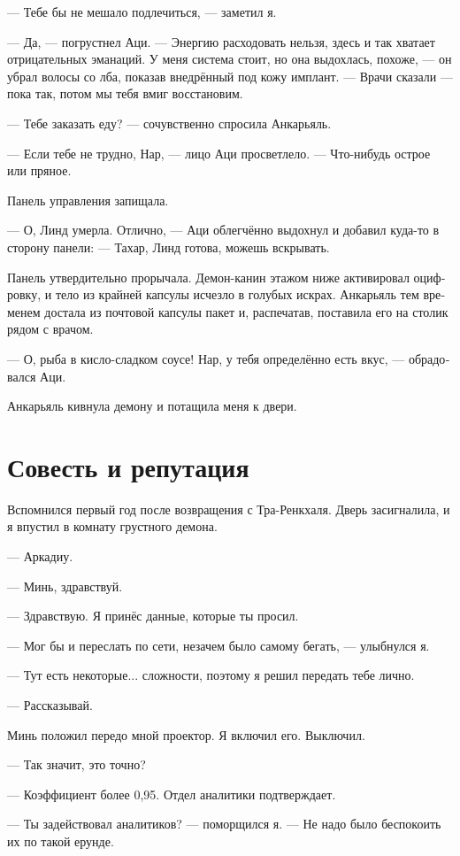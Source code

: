 \documentclass[a4paper,12pt,fleqn]{book}\usepackage{cooltooltips}\usepackage{polyglossia}\setdefaultlanguage[babelshorthands=true]{russian}\setotherlanguage{english}\defaultfontfeatures{Ligatures=TeX,Mapping=tex-text} \usepackage{xcolor}\definecolor{lightgray}{HTML}{bbbbbb}\color{lightgray}\newcommand{\ml}[3]{\textenglish{\textcolor{black}{#3}}}
\begin{document}
{--- Тебе бы не мешало подлечиться, --- заметил я.

--- Да, --- погрустнел Аци.
--- Энергию расходовать нельзя, здесь и так хватает отрицательных эманаций.
У меня система стоит, но она выдохлась, похоже, --- он убрал волосы со лба, показав внедрённый под кожу имплант.
--- Врачи сказали --- пока так, потом мы тебя вмиг восстановим.

--- Тебе заказать еду? --- сочувственно спросила Анкарьяль.

--- Если тебе не трудно, Нар, --- лицо Аци просветлело.
--- Что-нибудь острое или пряное.

Панель управления запищала.

--- О, Линд умерла.
Отлично, --- Аци облегчённо выдохнул и добавил куда-то в сторону панели:
--- Тахар, Линд готова, можешь вскрывать.

Панель утвердительно прорычала.
Демон-канин этажом ниже активировал оцифровку, и тело из крайней капсулы исчезло в голубых искрах.
Анкарьяль тем временем достала из почтовой капсулы пакет и, распечатав, поставила его на столик рядом с врачом.

--- О, рыба в кисло-сладком соусе!
Нар, у тебя определённо есть вкус, --- обрадовался Аци.

Анкарьяль кивнула демону и потащила меня к двери.

\section{Совесть и репутация}

Вспомнился первый год после возвращения с Тра-Ренкхаля.
Дверь засигналила, и я впустил в комнату грустного демона.

--- Аркадиу.

--- Минь, здравствуй.

--- Здравствую.
Я принёс данные, которые ты просил.

--- Мог бы и переслать по сети, незачем было самому бегать, --- улыбнулся я.

--- Тут есть некоторые... сложности, поэтому я решил передать тебе лично.

--- Рассказывай.

Минь положил передо мной проектор.
Я включил его.
Выключил.

--- Так значит, это точно?

--- Коэффициент более 0,95.
Отдел аналитики подтверждает.

--- Ты задействовал аналитиков? --- поморщился я.
--- Не надо было беспокоить их по такой ерунде.

}
\end{document}
